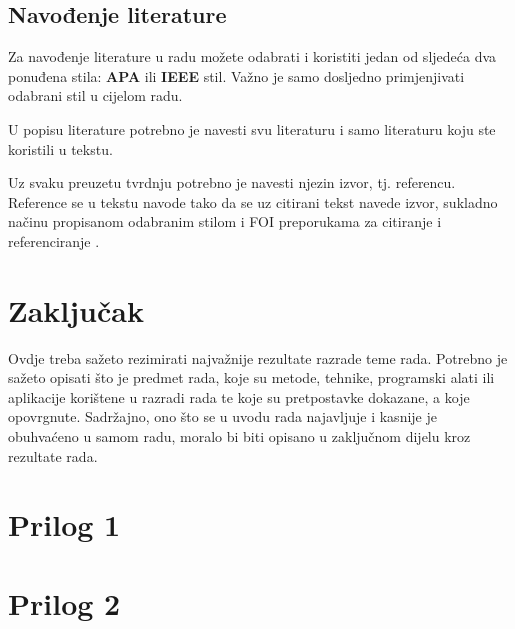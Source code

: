 \documentclass{foi}
\begin{document}
\section{Navođenje literature}

Za navođenje literature u radu možete odabrati i koristiti jedan od sljedeća dva ponuđena stila: \textbf{APA} ili \textbf{IEEE} stil. Važno je samo dosljedno primjenjivati odabrani stil u cijelom radu.

U popisu literature potrebno je navesti svu literaturu i samo literaturu koju ste koristili u tekstu.

Uz svaku preuzetu tvrdnju potrebno je navesti njezin izvor, tj. referencu. Reference se u tekstu navode tako da se uz citirani tekst navede izvor, sukladno načinu propisanom odabranim stilom i FOI preporukama za citiranje i referenciranje \cite{SchattenEtAl2016roadmap}.

\chapter{Zaključak}

Ovdje treba sažeto rezimirati najvažnije rezultate razrade teme rada. Potrebno je sažeto opisati što je predmet rada, koje su metode, tehnike, programski alati ili aplikacije korištene u razradi rada te koje su pretpostavke dokazane, a koje opovrgnute. Sadržajno, ono što se u uvodu rada najavljuje i kasnije je obuhvaćeno u samom radu, moralo bi biti opisano u zaključnom dijelu kroz rezultate rada. 

\lipsum[1-2]

\printbibliography[title=Popis literature]

\listoffigures
{}
 
\listoftables
{}

\appendix
\renewcommand{\thechapter}{\arabic{chapter}}

\chapter{Prilog 1}

\chapter{Prilog 2}
\end{document}
